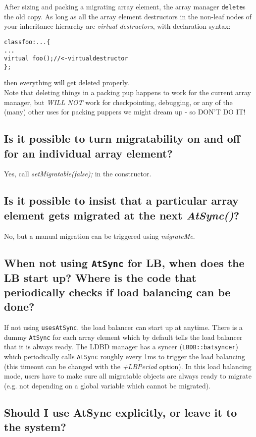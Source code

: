 After sizing and packing a migrating array element, the array manager
{\tt delete}s
the old copy. As long as all the array element destructors in the non-leaf
nodes of your inheritance hierarchy are {\em virtual destructors}, with
declaration syntax:
\begin{alltt}
class foo : ... \{
  ...
  virtual ~foo(); // <- virtual destructor
\};
\end{alltt}
then everything will get deleted properly.\\
Note that deleting things in a packing pup happens to work for the
current array manager, but {\em WILL NOT} work for checkpointing, debugging,
or any of the (many) other uses for packing puppers we might dream up -
so DON'T DO IT!

\subsection{Is it possible to turn migratability on and off for an individual array
element?}

Yes, call {\em setMigratable(false);} in the constructor.

\subsection{Is it possible to insist that a particular array element gets migrated
at the next {\em AtSync()}?}

No, but a manual migration can be triggered using {\em migrateMe}.


\subsection{When not using {\tt AtSync} for LB, when does the LB start
up? Where is the code that periodically checks if load balancing can be
done?}

If not using {\tt usesAtSync}, the load balancer can start up at
anytime. There is a dummy {\tt AtSync} for each array element which
by default tells the load balancer that it is always ready. The LDBD manager
has a syncer ({\tt LBDB::batsyncer}) which periodically calls {\tt AtSync}
roughly every 1ms to trigger the load balancing (this timeout can be changed
with the {\em +LBPeriod} option). In this load balancing
mode, users have to make sure all migratable objects are always ready to
migrate (e.g. not depending on a global variable which cannot be migrated).

\subsection{Should I use AtSync explicitly, or leave it to the system?}

